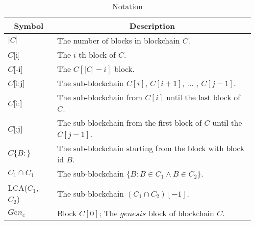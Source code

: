 \begin{table}[H]
\begin{tabular}{ll}
\hline
\multicolumn{1}{|c|}{Symbol} & \multicolumn{1}{c|}{Description}\\ \hline
$|C|$           & The number of blocks in blockchain $C$. \\
$C${[}i{]}      & The $i$-th block of $C$. \\
$C${[}-i{]}     & The $C[|C|-i]$ block. \\
$C${[}i:j{]}    & The sub-blockchain $C[i]$, $C[i+1]$, ... , $C[j-1]$. \\
$C${[}i:{]}     & The sub-blockchain from $C[i]$ until the last block of $C$. \\
$C${[}:j{]}     & The sub-blockchain from the first block of $C$ until the $C[j-1]$. \\
$C\{B :\}$      & The sub-blockchain starting from the block with block id $B$. \\
$C_1 \cap C_1$  & The sub-blockchain $\{B : B \in C_1 \land B \in C_2 \}$. \\
LCA($C_1$, $C_2$) & The sub-blockchain $(C_1 \cap C_2)[-1]$. \\
$Gen_c$           & Block $C[0]$; The $genesis$ block of blockchain $C$. \\

\end{tabular}
\caption{Notation}
\label{table:notation_nipopow}
\end{table}
